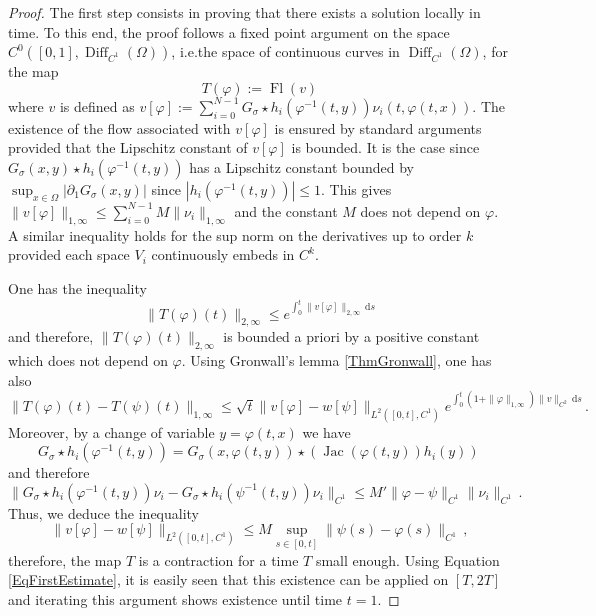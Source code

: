 \documentclass{article}
\numberwithin{equation}{section}
\let\on=\operatorname
\newcommand{\ud}{\,\mathrm{d}}
\newcommand{\ie}{{i.e.}}
\begin{document}
\begin{proof}
The first step consists in proving that there exists a solution locally in time. To this end, the proof follows a fixed point argument on the space $C^0([0,1],\on{Diff}_{C^1}(\Omega))$, \ie  the space of continuous curves in $\on{Diff}_{C^1}(\Omega)$, for the map
\begin{equation}
T(\varphi) := \on{Fl}(v)
\end{equation}
where $v$ is defined as $v[\varphi] := \sum_{i = 0}^{N-1} G_\sigma \star h_i(\varphi^{-1}(t,y))  \nu_i(t,\varphi(t,x))$. 
The existence of the flow associated with $v[\varphi]$ is ensured by standard arguments provided that the Lipschitz constant of $v[\varphi]$ is bounded. It is the case since $G_\sigma(x,y) \star h_i(\varphi^{-1}(t,y))$ has a Lipschitz constant bounded by $ \sup_{x \in \Omega }| \partial_1 G_{\sigma}(x,y)|$ since $| h_i(\varphi^{-1}(t,y)) | \leq 1$. This gives $\| v[\varphi] \|_{1,\infty} \leq  \sum_{i = 0}^{N-1} M \| \nu_i \|_{1,\infty}$ and the constant $M$ does not depend on $\varphi$. A similar inequality holds for the sup norm on the  derivatives up to order $k$ provided each space $V_i$ continuously embeds in $C^k$.
\par
One has the inequality
\begin{equation}\label{EqFirstEstimate}
\| T(\varphi)(t) \|_{2,\infty} \leq e^{\int_0^t \| v[\varphi] \|_{2,\infty} \ud s}
\end{equation}
and therefore, $\| T(\varphi)(t) \|_{2,\infty}$ is bounded a priori by a positive constant which does not depend on $\varphi$.
Using Gronwall's lemma \eqref{ThmGronwall}, one has also
\begin{equation}
\| T(\varphi)(t) - T(\psi)(t) \|_{1,\infty} \leq \sqrt{t} \| v[\varphi] - w[\psi] \|_{L^2([0,t],C^1)} e^{\int_0^t (1 + \| \varphi \|_{1,\infty}) \| v \|_{C^2} \ud s}\,.
\end{equation}
Moreover, by a change of variable $y=\varphi(t,x)$ we have
\begin{equation}
G_\sigma \star h_i(\varphi^{-1}(t,y)) = G_\sigma(x,\varphi(t,y)) \star (\on{Jac}(\varphi(t,y))h_i(y))\,
\end{equation}
and therefore
\begin{equation}
\| G_\sigma \star h_i(\varphi^{-1}(t,y))  \nu_i - G_\sigma \star h_i(\psi^{-1}(t,y))  \nu_i \|_{C^1}  \leq M' \| \varphi - \psi \|_{C^1} \| \nu_i \|_{C^1}\,.
\end{equation}
Thus, we deduce the inequality
\begin{equation}
\| v[\varphi] - w[\psi] \|_{L^2([0,t],C^1)} \leq M \sup_{s \in [0,t]} \| \psi(s) - \varphi(s) \|_{C^1}\,,
\end{equation}
therefore, the map $T$ is a contraction for a time $T$ small enough. 
Using Equation \eqref{EqFirstEstimate}, it is easily seen that this existence can be applied on $[T,2T]$ and iterating this argument shows existence until time $t=1$.
\end{proof}
\end{document}
